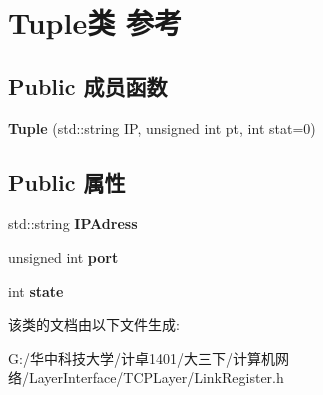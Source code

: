 \hypertarget{class_tuple}{}\section{Tuple类 参考}
\label{class_tuple}
\subsection*{Public 成员函数}
\begin{DoxyCompactItemize}
\item 
\mbox{\label{class_tuple_a982d5686d92651ec8364c1fd62d834aa}} 
{\bfseries Tuple} (std\+::string IP, unsigned int pt, int stat=0)
\end{DoxyCompactItemize}
\subsection*{Public 属性}
\begin{DoxyCompactItemize}
\item 
\mbox{\label{class_tuple_ab337a99a4e1461e69583204f91411236}} 
std\+::string {\bfseries I\+P\+Adress}
\item 
\mbox{\label{class_tuple_aaf88caeb0b83349dcdb398babe704999}} 
unsigned int {\bfseries port}
\item 
\mbox{\label{class_tuple_a600cae002bc27e9345905a600f0736ae}} 
int {\bfseries state}
\end{DoxyCompactItemize}


该类的文档由以下文件生成\+:\begin{DoxyCompactItemize}
\item 
G\+:/华中科技大学/计卓1401/大三下/计算机网络/\+Layer\+Interface/\+T\+C\+P\+Layer/Link\+Register.\+h\end{DoxyCompactItemize}
